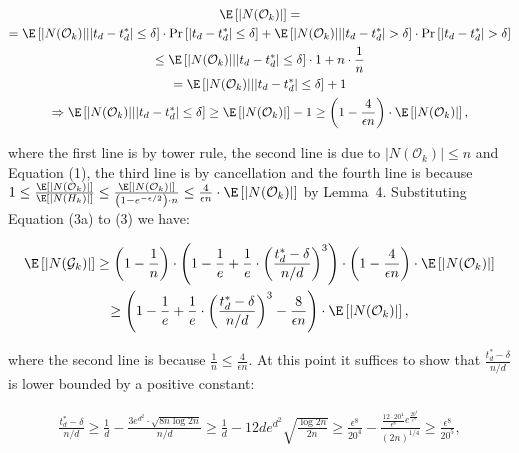 \[\begin{gathered}
\displaystyle\E \displaystyle\left[|N(\mathcal{O}_{k})|\right]= \\
\displaystyle=\E\left[|N(\mathcal{O}_{k})|\middle||t_{d}-t^{*}_{d}|\leq\delta\right]\cdot\Pr\left[|t_{d}-t^{*}_{d}|\leq\delta\right]+\E\left[|N(\mathcal{O}_{k})|\middle||t_{d}-t^{*}_{d}|>\delta\right]\cdot\Pr\left[|t_{d}-t^{*}_{d}|>\delta\right] \\
\displaystyle\leq\E\left[|N(\mathcal{O}_{k})|\middle||t_{d}-t^{*}_{d}|\leq\delta\right]\cdot 1+n\cdot\frac{1}{n} \\
\displaystyle=\E\left[|N(\mathcal{O}_{k})|\middle||t_{d}-t^{*}_{d}|\leq\delta\right]+1 \\
\displaystyle\Rightarrow\E\left[|N(\mathcal{O}_{k})|\middle||t_{d}-t^{*}_{d}|\leq\delta\right]\geq\E\left[|N(\mathcal{O}_{k})|\right]-1\geq\left(1-\frac{4}{\epsilon n}\right)\cdot\E\left[|N(\mathcal{O}_{k})|\right],
\end{gathered}\]


where the first line is by tower rule, the second line is due to $|N(\mathcal{O}_{k})|\leq n$ and Equation (1), the third line is by cancellation and the fourth line is because $1\leq\frac{\E\left[|N(\mathcal{O}_{k})|\right]}{\E\left[|N(H_{k})|\right]}\leq\frac{\E\left[|N(\mathcal{O}_{k})|\right]}{\left(1-e^{-\epsilon/2}\right)\cdot n}\leq\frac{4}{\epsilon n}\cdot\E\left[|N(\mathcal{O}_{k})|\right]$ by Lemma 4.
Substituting Equation (3a) to (3) we have:\par


\[\begin{gathered}
\displaystyle\E\left[|N(\mathcal{G}_{k})|\right] \displaystyle\geq\left(1-\frac{1}{n}\right)\cdot\left(1-\frac{1}{e}+\frac{1}{e}\cdot\left(\frac{t^{*}_{d}-\delta}{n/d}\right)^{3}\right)\cdot\left(1-\frac{4}{\epsilon n}\right)\cdot\E\left[|N(\mathcal{O}_{k})|\right] \\
\displaystyle\geq\left(1-\frac{1}{e}+\frac{1}{e}\cdot\left(\frac{t^{*}_{d}-\delta}{n/d}\right)^{3}-\frac{8}{\epsilon n}\right)\cdot\E\left[|N(\mathcal{O}_{k})|\right],
\end{gathered}\]


where the second line is because $\frac{1}{n}\leq\frac{4}{\epsilon n}$.
At this point it suffices to show that $\frac{t^{*}_{d}-\delta}{n/d}$ is lower bounded by a positive constant:\par


\[\begin{gathered}
\displaystyle\frac{t^{*}_{d}-\delta}{n/d}\geq\frac{1}{d}-\frac{3e^{d^{2}}\cdot\sqrt{8n\log{2n}}}{n/d}\geq\frac{1}{d}-12de^{d^{2}}\sqrt{\frac{\log{2n}}{2n}}\geq\frac{\epsilon^{8}}{20^{4}}-\frac{\frac{12\cdot 20^{4}}{\epsilon^{8}}e^{\frac{20^{4}}{\epsilon^{8}}}}{(2n)^{1/4}}\geq\frac{\epsilon^{8}}{20^{5}},
\end{gathered}\]


